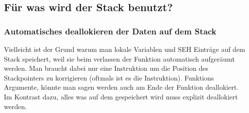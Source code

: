 
\subsection{Für was wird der Stack benutzt?}



\EN{}
\RU{}
\DE{}
\PTBR{}




\subsubsection{Automatisches deallokieren der Daten auf dem Stack}

Vielleicht ist der Grund warum man lokale Variablen und SEH Einträge auf dem Stack speichert, weil sie beim 
verlassen der Funktion automatisch aufgeräumt werden. Man braucht dabei nur eine Instruktion um die Position
des Stackpointers zu korrigieren (oftmals ist es die \ADD Instruktion). Funktions Argumente, könnte man sagen 
werden auch am Ende der Funktion deallokiert. Im Kontrast dazu, alles was auf dem  gespeichert wird muss
explizit deallokiert werden. 

\EN{}
\RU{}
\DE{}
\PTBR{}


